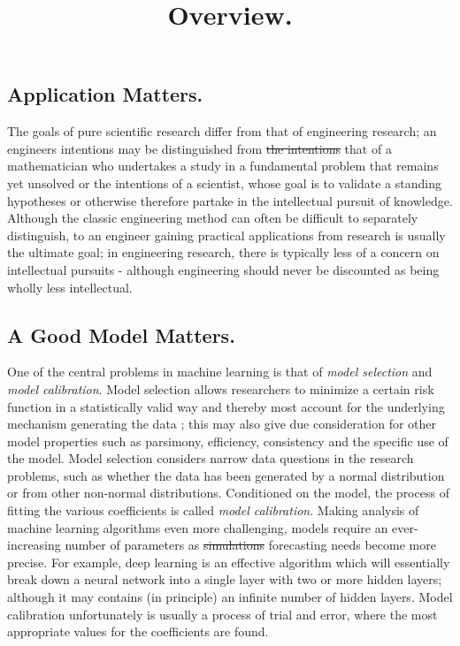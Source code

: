 \documentclass[10pt]{article}[draft]
\begin{document}
\title{Overview.}
\date{}
\maketitle


\begin{center}
	\subsection*{Application Matters.}
\end{center}
	
The goals of pure scientific research differ from that of engineering research; an engineers intentions may be distinguished from \st{the intentions} that of a mathematician who undertakes a study in a fundamental problem that remains yet unsolved or the intentions of a scientist, whose goal is to validate a standing hypotheses or otherwise therefore partake in the intellectual pursuit of knowledge. 	Although the classic engineering method can often be difficult to separately distinguish, to an engineer gaining practical applications from research is usually the ultimate goal; in  engineering research, there is typically less of a concern on intellectual pursuits - although engineering should never be discounted as being wholly less intellectual.  

\vspace{0.25in}
\subsection*{A Good Model Matters.}

One of the central problems in machine learning is that of \emph{model selection} and \emph{model calibration}. {Model selection} allows researchers to minimize a certain risk function in a statistically valid way and thereby most account for the underlying mechanism generating the data ; this may also give due consideration for other model properties such as parsimony, efficiency, consistency and  the specific use of the model. Model selection considers narrow data questions in the research  problems, such as whether the data has been generated by a normal distribution or from other non-normal distributions. Conditioned on the model, the process of fitting the various coefficients is called \emph{ model calibration}. Making analysis of machine learning algorithms even more challenging, models require an ever-increasing number of parameters as \st{simulations} forecasting needs become more precise. For example, deep learning is an effective algorithm which will essentially break down a neural network into a single layer with two or more hidden layers; although it may contains (in principle) an infinite number of hidden layers. Model calibration unfortunately is usually a process of trial and error, where the most appropriate values for the  coefficients are found.  
\end{document}
